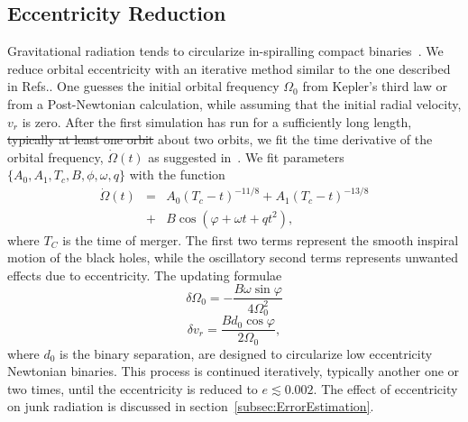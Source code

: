 \documentclass[aps,prd,amsmath,floatfix,twocolumn,superscriptaddress,nofootinbib,showpacs]{revtex4-1}
\theoremstyle{plain}
\theoremstyle{definition}
\newcommand{\harald}[1]{\textcolor{OliveGreen}{#1}}
\begin{document}
\subsection{Eccentricity Reduction}
Gravitational radiation tends to circularize in-spiralling compact
binaries~\cite{PetersMathews1963,Peters1964}. We reduce orbital
eccentricity with an iterative method similar to the one described in
Refs.\cite{Boyle2007,Chu2009}. One guesses the initial orbital
frequency $\Omega_0$ from Kepler's third law or from a Post-Newtonian
calculation, while assuming that the initial radial velocity, $v_r$ is
zero. After the first simulation has run for a sufficiently long
length, \harald{\sout{typically at least one orbit} about two orbits}, we fit the time derivative of
the orbital frequency, $\dot{\Omega}(t)$ as suggested
in~\cite{Buonanno:2010yk}.  \harald{We fit parameters $\{A_0, A_1, T_c, B, \phi, \omega, q\}$ with the function}
\begin{eqnarray}
\dot{\Omega}(t)&=&A_0\left(T_c-t\right)^{-11/8}+A_1\left(T_c-t\right)^{-13/8}\\
&+&B\cos\left(\varphi + \omega
  t+qt^2\right), \nonumber
\end{eqnarray}
where $T_C$ is the time of merger. The first two terms represent the
smooth inspiral motion of the black holes, while the oscillatory
second terms represents unwanted effects due to eccentricity. The
updating formulae
\begin{equation}
\delta\Omega_0=-\frac{B\omega\sin{\varphi}}{4\Omega_0^2}
\end{equation}
\begin{equation}
\delta v_r = \frac{B d_0\cos{\varphi}}{2\Omega_0},
\end{equation}
where $d_0$ is the binary separation, are designed to circularize low eccentricity Newtonian binaries. This
process is continued iteratively, typically another one or two times,
until the eccentricity is reduced to $e\lesssim 0.002$. The effect of
eccentricity on junk radiation is discussed in section~\ref{subsec:ErrorEstimation}.

%
\end{document}
